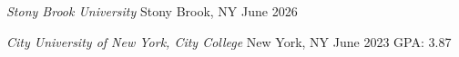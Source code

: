 \textit{Stony Brook University} \hfill	Stony Brook, NY
\newline
{} \hfill June 2026
\newline

\textit{City University of New York, City College} \hfill	New York, NY
\newline
{} \hfill June 2023
\newline
GPA: 3.87